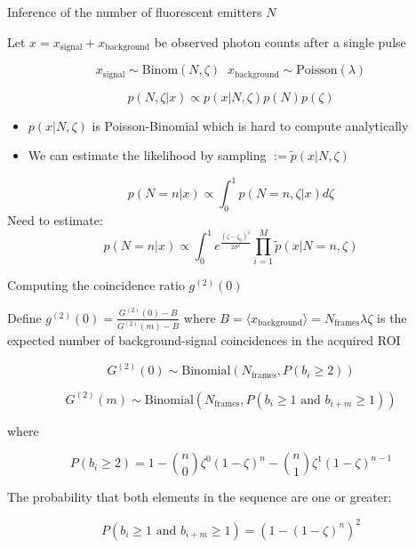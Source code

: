 \documentclass{beamer}					%
\begin{document}
\begin{frame}{Inference of the number of fluorescent emitters $N$}

Let $x = x_{\mathrm{signal}} + x_{\mathrm{background}}$ be observed photon counts after a single pulse

\begin{equation*}
x_{\mathrm{signal}} \sim \mathrm{Binom}(N,\zeta) \;\; x_{\mathrm{background}} \sim \mathrm{Poisson}(\lambda)
\end{equation*}

\begin{equation*}
p(N,\zeta|x) \propto p(x|N,\zeta)p(N)p(\zeta)
\end{equation*}

\begin{itemize}
\item $p(x|N,\zeta)$ is Poisson-Binomial which is hard to compute analytically
\item We can estimate the likelihood by sampling $:= \tilde{p}(x|N,\zeta)$
\end{itemize}

\begin{equation*}
p(N=n|x) \propto \int_{0}^{1} p(N=n,\zeta|x) d\zeta
\end{equation*}
Need to estimate:
\begin{equation*}
p(N=n|x) \propto \int_{0}^{1} e^{\frac{(\zeta-\zeta_{0})^{2}}{2\sigma^{2}}} \prod_{i=1}^{M}  \tilde{p}(x|N=n,\zeta)
\end{equation*}

\end{frame}

\begin{frame}{Computing the coincidence ratio $g^{(2)}(0)$}

Define $g^{(2)}(0) = \frac{G^{(2)}(0)-B}{G^{(2)}(m)-B}$ where $B = \langle x_{\mathrm{background}}\rangle = N_{\mathrm{frames}}\lambda\zeta$ is the expected number of background-signal coincidences in the acquired ROI 

\begin{equation*}
G^{(2)}(0) \sim \mathrm{Binomial}(N_{\mathrm{frames}}, P(b_i \geq 2))
\end{equation*}

\begin{equation*}
G^{(2)}(m) \sim \mathrm{Binomial}(N_{\mathrm{frames}}, P(b_i \geq 1 \text{ and } b_{i+m} \geq 1))
\end{equation*}

where

\begin{equation*}
P(b_i \geq 2) = 1 - \binom{n}{0} \zeta^0 (1-\zeta)^n - \binom{n}{1} \zeta^1 (1-\zeta)^{n-1}
\end{equation*}

The probability that both elements in the sequence are one or greater:

\begin{equation*}
P(b_i \geq 1 \text{ and } b_{i+m} \geq 1) = (1 - (1-\zeta)^n)^2
\end{equation*}

\end{frame}
\end{document}
